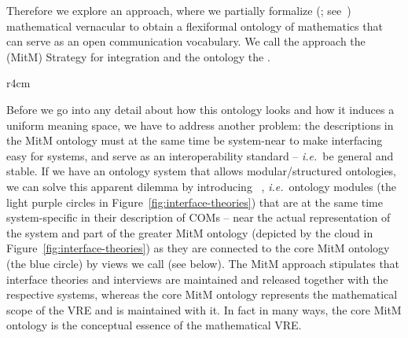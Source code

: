Therefore we explore an approach, where we partially formalize (;
see~\cite{Kohlhase:tffm13}) mathematical vernacular to obtain a flexiformal ontology of
mathematics that can serve as an open communication vocabulary. We call the approach the
 (MitM) Strategy for integration and the ontology the .

\begin{wrapfigure}r{4cm}\vspace*{-1.5em}
  \vspace*{-.5em}
  \caption{Interface theories}\label{fig:interface-theories}\vspace*{-1em}
\end{wrapfigure}
Before we go into any detail about how this ontology looks and how it induces a uniform
meaning space, we have to address another problem: the descriptions in the MitM ontology
must at the same time be system-near to make interfacing easy for systems, and serve as
an interoperability standard -- \emph{i.e.}\ be general and stable. If we have an ontology system
that allows modular/structured ontologies, we can solve this apparent dilemma by
introducing ~\cite{KohRabSac:fvip11}, \emph{i.e.}\ ontology modules
(the light purple circles in Figure~\ref{fig:interface-theories}) that are at the same
time system-specific in their description of COMs -- near the actual representation of the
system and part of the greater MitM ontology (depicted by the cloud in
Figure~\ref{fig:interface-theories}) as they are connected to the core MitM ontology (the
blue circle) by views we call  (see below). The MitM approach
stipulates that interface theories and interviews are maintained and released together with
the respective systems, whereas the core MitM ontology represents the mathematical scope
of the VRE and is maintained with it. In fact in many ways, the core MitM ontology is the
conceptual essence of the mathematical VRE.

